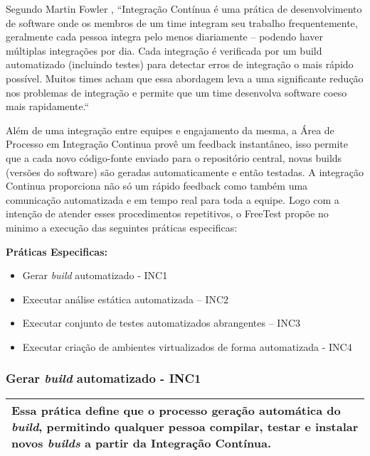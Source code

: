 Segundo Martin Fowler \cite{Beck2001}, “Integração Contínua é uma prática de desenvolvimento de software onde os membros de um time integram seu trabalho frequentemente, geralmente cada pessoa integra pelo menos diariamente – podendo haver múltiplas integrações por dia. Cada integração é verificada por um build automatizado (incluindo testes) para detectar erros de integração o mais rápido possível. Muitos times acham que essa abordagem leva a uma significante redução nos problemas de integração e permite que um time desenvolva software coeso mais rapidamente.“

Além de uma integração entre equipes e engajamento da mesma, a Área de Processo em Integração Continua provê um feedback instantâneo, isso permite que a cada novo código-fonte enviado para o repositório central, novas builds (versões do software) são geradas automaticamente e então testadas. A integração Continua proporciona não só um rápido feedback como também uma comunicação automatizada e em tempo real para toda a equipe. Logo com a intenção de atender esses procedimentos repetitivos, o FreeTest propõe no minimo a execução das seguintes práticas especificas:

\textbf{Práticas Especificas:}

\begin{itemize}    
    \item Gerar \textit{build} automatizado - INC1
    \item Executar análise estática automatizada – INC2
    \item Executar conjunto de testes automatizados abrangentes – INC3
    \item Executar criação de ambientes virtualizados de forma automatizada - INC4
\end{itemize}

\subsubsection{Gerar \textit{build} automatizado - INC1}
\label{sec:inc1}

\begin{table}[H]
\centering
\begin{tabular}{|p{130mm}|}
\hline
Essa prática define que o processo geração automática do \textit{build}, permitindo qualquer pessoa compilar, testar e instalar novos \textit{builds} a partir da Integração Contínua. \\
\hline
\end{tabular}
\end{table}

